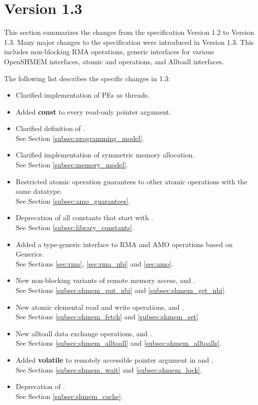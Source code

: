 \section{Version 1.3}
This section summarizes the changes from the \openshmem specification Version
1.2 to Version 1.3. Many major changes to the specification were introduced in Version 1.3. This includes non-blocking RMA operations, 
generic interfaces for various OpenSHMEM interfaces, atomic  and  operations,  and Alltoall interfaces. 


The following list describes the specific changes in 1.3:

\begin{itemize}
%
\item Clarified implementation of \acp{PE} as threads.
%
\item Added \textbf{const} to every read-only pointer argument.
%
\item Clarified definition of .
\\See Section \ref{subsec:programming_model}.
%
\item Clarified implementation of symmetric memory allocation.
\\See Section \ref{subsec:memory_model}.
%
\item Restricted atomic operation guarantees to other atomic operations with the same datatype.
\\See Section \ref{subsec:amo_guarantees}.
%
\item Deprecation of all constants that start with .
\\See Section \ref{subsec:library_constants}.
%
\item Added a type-generic interface to \openshmem \ac{RMA} and \ac{AMO}
	operations based on \Cstd[11] Generics.
\\See Sections \ref{sec:rma}, \ref{sec:rma_nbi} and \ref{sec:amo}.
%
\item New non-blocking variants of remote memory access, 
	and .
\\See Sections \ref{subsec:shmem_put_nbi} and \ref{subsec:shmem_get_nbi}.
%
\item New atomic elemental read and write operations,  and
	.
\\See Sections \ref{subsec:shmem_fetch} and \ref{subsec:shmem_set}
%
\item New alltoall data exchange operations,  
	and .
\\See Sections \ref{subsec:shmem_alltoall} and \ref{subsec:shmem_alltoalls}.
%
\item Added \textbf{volatile} to remotely accessible pointer argument in 
	 and .
\\See Sections \ref{subsec:shmem_wait} and \ref{subsec:shmem_lock}.
%
\item Deprecation of .
\\See Section \ref{subsec:shmem_cache}.
%
\end{itemize}




